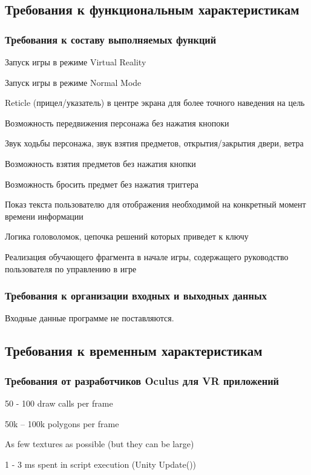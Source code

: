 

\subsection{Требования к функциональным характеристикам}
\subsubsection{Требования к составу выполняемых функций}
\begin{my_enumerate}
\item Запуск игры в режиме Virtual Reality
\item Запуск игры в режиме Normal Mode
\item Reticle (прицел/указатель) в центре экрана для более точного наведения на цель
\item Возможность передвижения персонажа без нажатия кнопоки
\item Звук ходьбы персонажа, звук взятия предметов, открытия/закрытия двери, ветра
\item Возможность взятия предметов без нажатия кнопки
\item Возможность бросить предмет без нажатия триггера
\item Показ текста пользователю для отображения необходимой на конкретный момент времени информации
\item Логика головоломок, цепочка решений которых приведет к ключу
\item Реализация обучающего фрагмента в начале игры, содержащего руководство пользователя по управлению в игре
\end{my_enumerate}

\subsubsection{Требования к организации входных и выходных данных}
Входные данные программе не поставляются.

\subsection{Требования к временным характеристикам}
\subsubsection{Требования от разработчиков Oculus для VR приложений}
\begin{my_enumerate}
    \item 50 - 100 draw calls per frame
    \item 50k – 100k polygons per frame
    \item As few textures as possible (but they can be large)
    \item 1 - 3 ms spent in script execution (Unity Update())
\end{my_enumerate}

